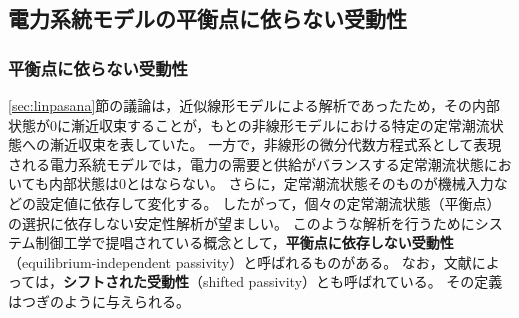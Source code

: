 \documentclass[tombow,dvipdfmx]{corona-a5-1.1}
\begin{document}
\subsection{電力系統モデルの平衡点に依らない受動性\advanced}

\smallskip
\subsubsection{平衡点に依らない受動性}

\ref{sec:linpasana}節の議論は，近似線形モデルによる解析であったため，その内部状態が0に漸近収束することが，もとの非線形モデルにおける特定の定常潮流状態への漸近収束を表していた。
一方で，非線形の微分代数方程式系として表現される電力系統モデルでは，電力の需要と供給がバランスする定常潮流状態においても内部状態は0とはならない。
さらに，定常潮流状態そのものが機械入力などの設定値に依存して変化する。
したがって，個々の定常潮流状態（平衡点）の選択に依存しない安定性解析が望ましい。
このような解析を行うためにシステム制御工学で提唱されている概念として，\textbf{平衡点に依存しない受動性}（equilibrium-independent passivity）と呼ばれるものがある\cite{hines2011equilibrium,simpson2019equilibrium}。
なお，文献によっては，\textbf{シフトされた受動性}（shifted passivity）とも呼ばれている\cite{monshizadeh2019conditions}。
その定義はつぎのように与えられる。
\end{document}
